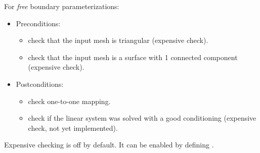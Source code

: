 For \emph{free} boundary parameterizations:
\begin{itemize}
\item Preconditions:
    \begin{itemize}
    \item check that the input mesh is triangular (expensive check).
    \item check that the input mesh is a surface with 1 connected component (expensive check).
    \end{itemize}
\item Postconditions:
    \begin{itemize}
    \item check one-to-one mapping.
    \item check if the linear system was solved with a good conditioning (expensive check, not yet implemented).
    \end{itemize}
\end{itemize}

Expensive checking is off by default. It can be enabled by
defining .



  \\
  \\
  \\
  \\
  \\



  \\
  \\
  \\
  \\
  \\
  \\
  \\



